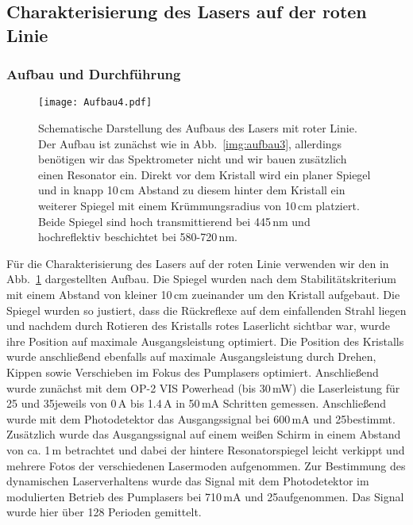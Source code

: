 \subsection{Charakterisierung des Lasers auf der roten Linie}

\subsubsection{Aufbau und Durchführung}

\begin{figure}[H]
\begin{center}
  \texttt{[image: Aufbau4.pdf]}
  \caption{Schematische Darstellung des Aufbaus des Lasers mit roter Linie.
  Der Aufbau ist zunächst wie in Abb.~\ref{img:aufbau3},
  allerdings benötigen wir das Spektrometer nicht und wir bauen zusätzlich einen Resonator ein.
   Direkt vor dem Kristall wird ein planer Spiegel und in knapp 10\,cm Abstand
   zu diesem hinter dem Kristall ein weiterer Spiegel mit einem Krümmungsradius von 10\,cm platziert.
   Beide Spiegel sind hoch transmittierend bei 445\,nm und hochreflektiv beschichtet bei 580-720\,nm.}
  \label{img:aufbau4}
\end{center}
\end{figure}

Für die Charakterisierung des Lasers auf der roten Linie verwenden wir den in
Abb.~\ref{img:aufbau4} dargestellten Aufbau. Die Spiegel wurden nach dem Stabilitätskriterium mit
einem Abstand von kleiner 10\,cm zueinander um den Kristall aufgebaut. Die Spiegel wurden so
justiert, dass die Rückreflexe auf dem einfallenden Strahl liegen und nachdem durch Rotieren des
Kristalls rotes Laserlicht sichtbar war, wurde ihre Position auf maximale Ausgangsleistung
optimiert. Die Position des Kristalls wurde anschließend ebenfalls auf maximale Ausgangsleistung
durch Drehen, Kippen sowie Verschieben im Fokus des Pumplasers optimiert.
Anschließend wurde zunächst mit dem OP-2 VIS Powerhead (bis 30\,mW) die Laserleistung für 25\grad
und 35\grad jeweils von 0\,A bis 1.4\,A in 50\,mA Schritten gemessen.
Anschließend wurde mit dem Photodetektor das Ausgangssignal bei 600\,mA und 25\grad bestimmt.
Zusätzlich wurde das Ausgangssignal auf einem weißen Schirm in einem Abstand von ca. 1\,m
betrachtet und dabei der hintere Resonatorspiegel leicht verkippt und mehrere Fotos der
verschiedenen Lasermoden aufgenommen.
Zur Bestimmung des dynamischen Laserverhaltens wurde das Signal mit dem Photodetektor im
modulierten Betrieb des Pumplasers bei 710\,mA und 25\grad aufgenommen. Das Signal wurde hier über
128 Perioden gemittelt.





